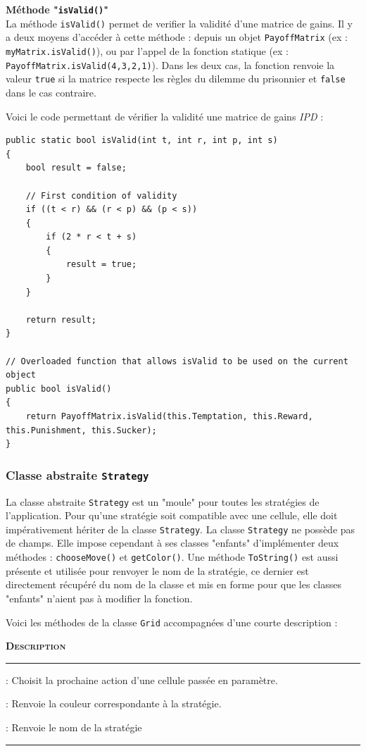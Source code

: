 \documentclass[a4paper]{article}
\begin{document}
\textbf{Méthode "\texttt{isValid()}"}\\
La méthode \texttt{isValid()} permet de verifier la validité d'une matrice de gains. Il y a deux moyens d'accéder à cette méthode : depuis un objet \texttt{PayoffMatrix} (ex : \texttt{myMatrix.isValid()}), ou par l'appel de la fonction statique (ex : \texttt{PayoffMatrix.isValid(4,3,2,1)}). Dans les deux cas, la fonction renvoie la valeur \texttt{true} si la matrice respecte les règles du dilemme du prisonnier et \texttt{false} dans le cas contraire.

Voici le code permettant de vérifier la validité une matrice de gains \textit{IPD} :
\begin{lstlisting}
public static bool isValid(int t, int r, int p, int s)
{
    bool result = false;

    // First condition of validity
    if ((t < r) && (r < p) && (p < s))
    {
        if (2 * r < t + s)
        {
            result = true;
        }
    }

    return result;
}

// Overloaded function that allows isValid to be used on the current object
public bool isValid()
{
    return PayoffMatrix.isValid(this.Temptation, this.Reward, this.Punishment, this.Sucker);
}
\end{lstlisting}

\pagebreak
\subsubsection{Classe abstraite \texttt{Strategy}}
La classe abstraite \texttt{Strategy} est un "moule" pour toutes les stratégies de l'application. Pour qu'une stratégie soit compatible avec une cellule, elle doit impérativement hériter de la classe \texttt{Strategy}. La classe \texttt{Strategy} ne possède pas de champs. Elle impose cependant à ses classes "enfants" d'implémenter deux méthodes : \texttt{chooseMove()} et \texttt{getColor()}. Une méthode \texttt{ToString()} est aussi présente et utilisée pour renvoyer le nom de la stratégie, ce dernier est directement récupéré du nom de la classe et mis en forme pour que les classes "enfants" n'aient pas à modifier la fonction.

Voici les méthodes de la classe \texttt{Grid} accompagnées d'une courte description : 
\vspace{0.25cm}
\begin{description}[labelwidth=4cm]
    \small
    \item[\textbf{\textsc{Méthode}}] \textbf{\textsc{Description}}
    \vspace{0.1cm}
    \hrule{}
    \item[\texttt{chooseMove()}] : Choisit la prochaine action d'une cellule passée en paramètre.
    \item[\texttt{getColor()}]   : Renvoie la couleur correspondante à la stratégie.
    \item[\texttt{ToString()}]   : Renvoie le nom de la stratégie
\end{description}
\vspace{0.25cm}
\hrule{}
\vspace{0.5cm}
\end{document}
